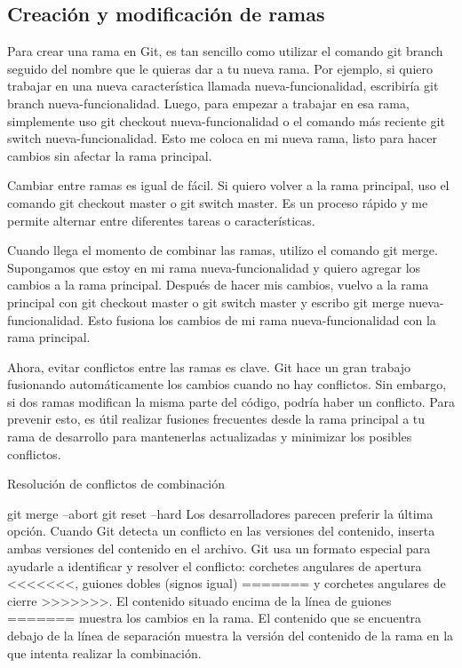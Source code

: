 \subsection*{Creación y modificación de ramas}

Para crear una rama en Git, es tan sencillo como utilizar el comando git branch 
seguido del nombre que le quieras dar a tu nueva rama. Por ejemplo, si quiero 
trabajar en una nueva característica llamada nueva-funcionalidad, escribiría git branch
nueva-funcionalidad. Luego, para empezar a trabajar en esa rama, simplemente 
uso git checkout nueva-funcionalidad o el comando más reciente git switch 
nueva-funcionalidad. Esto me coloca en mi nueva rama, listo para hacer cambios sin 
afectar la rama principal.


Cambiar entre ramas es igual de fácil. Si quiero volver a la rama principal, uso el 
comando git checkout master o git switch master. Es un proceso rápido y me permite 
alternar entre diferentes tareas o características.


Cuando llega el momento de combinar las ramas, utilizo el comando git merge. Supongamos 
que estoy en mi rama nueva-funcionalidad y quiero agregar los cambios a la rama 
principal. Después de hacer mis cambios, vuelvo a la rama principal con git checkout 
master o git switch master y escribo git merge nueva-funcionalidad. Esto fusiona los 
cambios de mi rama nueva-funcionalidad con la rama principal.


Ahora, evitar conflictos entre las ramas es clave. Git hace un gran trabajo fusionando 
automáticamente los cambios cuando no hay conflictos. Sin embargo, si dos ramas 
modifican la misma parte del código, podría haber un conflicto. Para prevenir esto, 
es útil realizar fusiones frecuentes desde la rama principal a tu rama de desarrollo 
para mantenerlas actualizadas y minimizar los posibles conflictos.


Resolución de conflictos de combinación

    git merge --abort
    git reset --hard
    Los desarrolladores parecen preferir la última opción. Cuando Git detecta un conflicto en las versiones del contenido, inserta ambas versiones del contenido en el archivo. Git usa un formato especial para ayudarle a identificar y resolver el conflicto: corchetes angulares de apertura <<<<<<<, guiones dobles (signos igual) ======= y corchetes angulares de cierre >>>>>>>. El contenido situado encima de la línea de guiones ======= muestra los cambios en la rama. El contenido que se encuentra debajo de la línea de separación muestra la versión del contenido de la rama en la que intenta realizar la combinación.

